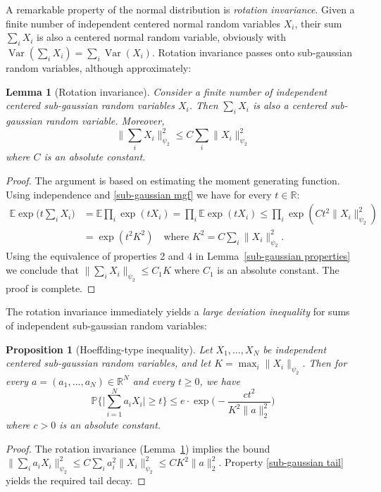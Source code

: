 \documentclass[10pt, openany]{book}
\newtheorem{proposition}[theorem]{Proposition}
\newtheorem{lemma}[theorem]{Lemma}
\theoremstyle{remark}
\DeclareMathOperator{\Var}{Var}
\def \R {\mathbb{R}}
\def \E {\mathbb{E}}
\def \P {\mathbb{P}}
\def \psitwo {{\psi_2}}
\begin{document}
A remarkable property of the normal distribution is {\em rotation invariance}. 
Given a finite number of independent centered normal random variables $X_i$,
their sum $\sum_i X_i$ is also a centered normal random variable, 
obviously with $\Var(\sum_i X_i) = \sum_i \Var(X_i)$.
Rotation invariance passes onto sub-gaussian random variables, although approximately:

\begin{lemma}[Rotation invariance]  			\label{rotation invariance}
  Consider a finite number of independent centered sub-gaussian random variables $X_i$.
  Then $\sum_i X_i$ is also a centered sub-gaussian random variable. Moreover, 
  $$
  \big\| \sum_i X_i \big\|_\psitwo^2 
  \le C \sum_i \|X_i\|_\psitwo^2
  $$
  where $C$ is an absolute constant. 
\end{lemma} 

\begin{proof}
The argument is based on estimating the moment generating function.
Using independence and \eqref{sub-gaussian mgf} we have for every $t \in \R$: 
\begin{align*}
\E \exp \big( t \sum_i X_i \big)
&= \E \prod_i \exp(t X_i) 
= \prod_i \E \exp(t X_i)
\le \prod_i \exp(C t^2 \|X_i\|_\psitwo^2) \\
&= \exp(t^2 K^2) \quad \text{where } K^2 = C \sum_i \|X_i\|_\psitwo^2.
\end{align*}
Using the equivalence of properties 2 and 4 in Lemma~\ref{sub-gaussian properties}
we conclude that $\|\sum_i X_i\|_\psitwo \le C_1 K$ where $C_1$ is an absolute constant. 
The proof is complete.
\end{proof}

The rotation invariance immediately yields a {\em large deviation inequality} 
for sums of independent sub-gaussian random variables: 

\begin{proposition}[Hoeffding-type inequality]		\label{sub-gaussian large deviations}
  Let $X_1,\ldots,X_N$ be independent centered sub-gaussian random variables,
  and let $K = \max_i \|X_i\|_\psitwo$. 
  Then for every  $a = (a_1,\ldots,a_N) \in \R^N$ and every $t \ge 0$, we have
  $$
  \P \Big\{ \Big| \sum_{i=1}^N a_i X_i \Big| \ge t \Big\} 
  \le e \cdot \exp \Big( -\frac{ct^2}{K^2\|a\|_2^2} \Big)
  $$   
  where $c>0$ is an absolute constant. 
\end{proposition}

\begin{proof}
The rotation invariance (Lemma~\ref{rotation invariance}) implies the bound
$\|\sum_i a_i X_i\|_\psitwo^2 \le C \sum_i a_i^2 \|X_i\|_\psitwo^2 \le C K^2 \|a\|_2^2$.
Property \eqref{sub-gaussian tail} yields the required tail decay.
\end{proof}
\end{document}
